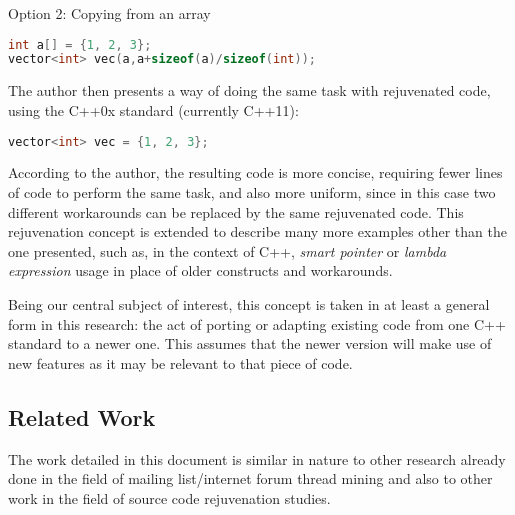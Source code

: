 Option 2: Copying from an array

\begin{lstlisting}[language=C++]
int a[] = {1, 2, 3};
vector<int> vec(a,a+sizeof(a)/sizeof(int));
\end{lstlisting}

The author then presents a way of doing the same task with rejuvenated code, using the C++0x standard (currently C++11):

\begin{lstlisting}[language=C++]
vector<int> vec = {1, 2, 3};
\end{lstlisting}

According to the author, the resulting code is more concise, requiring fewer lines of code to perform the same task, and also more uniform, since in this case two different workarounds can be replaced by the same rejuvenated code. This rejuvenation concept is extended to describe many more examples other than the one presented, such as, in the context of C++, \textit{smart pointer} or \textit{lambda expression} usage in place of older constructs and workarounds.

Being our central subject of interest, this concept is taken in at least a general form in this research: the act of porting or adapting existing code from one C++ standard to a newer one. This assumes that the newer version will make use of new features as it may be relevant to that piece of code.

\subsection{Related Work}

The work detailed in this document is similar in nature to other research already done in the field of mailing list/internet forum thread mining and also to other work in the field of source code rejuvenation studies.

